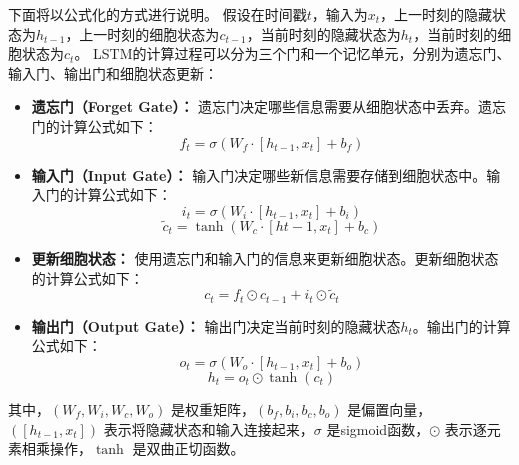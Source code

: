 下面将以公式化的方式进行说明。
假设在时间戳$t$，输入为$x_t$，上一时刻的隐藏状态为$h_{t-1}$，上一时刻的细胞状态为$c_{t-1}$，当前时刻的隐藏状态为$h_t$，当前时刻的细胞状态为$c_t$。
LSTM的计算过程可以分为三个门和一个记忆单元，分别为遗忘门、输入门、输出门和细胞状态更新：
\begin{itemize}
    \item \textbf{遗忘门（Forget Gate）：}
遗忘门决定哪些信息需要从细胞状态中丢弃。遗忘门的计算公式如下：
\begin{equation}
    f_t = \sigma(W_f \cdot [h_{t-1}, x_t] + b_f)
\end{equation}

\item \textbf{输入门（Input Gate）：}
输入门决定哪些新信息需要存储到细胞状态中。输入门的计算公式如下：
\begin{equation}
    i_t = \sigma(W_i \cdot [h_{t-1}, x_t] + b_i)
\end{equation}
\begin{equation}
    \tilde{c}_t = \tanh(W_c \cdot [h{t-1}, x_t] + b_c)
\end{equation}

\item \textbf{更新细胞状态：}
使用遗忘门和输入门的信息来更新细胞状态。更新细胞状态的计算公式如下：
\begin{equation}
    c_t = f_t \odot c_{t-1} + i_t \odot \tilde{c}_t
\end{equation}

\item \textbf{输出门（Output Gate）：}
输出门决定当前时刻的隐藏状态$h_t$。输出门的计算公式如下：
\begin{equation}
    o_t = \sigma(W_o \cdot [h_{t-1}, x_t] + b_o)
\end{equation}
\begin{equation}
    h_t = o_t \odot \tanh(c_t)
\end{equation}

\end{itemize}

其中，$(W_f, W_i, W_c, W_o)$ 是权重矩阵，$(b_f, b_i, b_c, b_o)$ 是偏置向量，$([h_{t-1}, x_t])$ 表示将隐藏状态和输入连接起来，$\sigma$ 是sigmoid函数，$\odot$ 表示逐元素相乘操作，$\tanh$ 是双曲正切函数。




